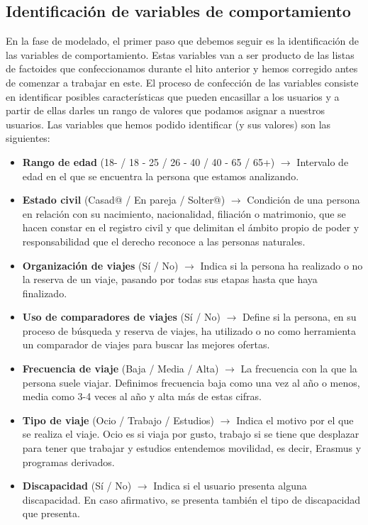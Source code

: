 \subsection{Identificación de variables de comportamiento}
En la fase de modelado, el primer paso que debemos seguir es la identificación de las variables de comportamiento. 
Estas variables van a ser producto de las listas de factoides que confeccionamos durante el hito anterior y hemos 
corregido antes de comenzar a trabajar en este. El proceso de confección de las variables consiste en identificar 
posibles características que pueden encasillar a los usuarios y a partir de ellas darles un rango de valores que 
podamos asignar a nuestros usuarios. Las variables que hemos podido identificar (y sus valores) son las siguientes:
\begin{itemize}
    \item \textbf{Rango de edad} (18- / 18 - 25 / 26 - 40 / 40 - 65 / 65+) $\rightarrow$ Intervalo de edad en el que se encuentra la persona que estamos analizando.
    \item \textbf{Estado civil} (Casad@ / En pareja / Solter@) $\rightarrow$ Condición de una persona en relación con su nacimiento, nacionalidad, filiación o 
    matrimonio, que se hacen constar en el registro civil y que delimitan el ámbito propio de poder y responsabilidad que el derecho reconoce a las personas naturales.
    \item \textbf{Organización de viajes} (Sí / No) $\rightarrow$ Indica si la persona ha realizado o no la reserva de un viaje, pasando por todas sus etapas hasta que
    haya finalizado.
    \item \textbf{Uso de comparadores de viajes} (Sí / No) $\rightarrow$ Define si la persona, en su proceso de búsqueda y reserva de viajes, ha utilizado o no como
    herramienta un comparador de viajes para buscar las mejores ofertas.
    \item \textbf{Frecuencia de viaje} (Baja / Media / Alta) $\rightarrow$ La frecuencia con la que la persona suele viajar. Definimos frecuencia baja como una vez al año
    o menos, media como 3-4 veces al año y alta más de estas cifras.
    \item \textbf{Tipo de viaje} (Ocio / Trabajo / Estudios) $\rightarrow$ Indica el motivo por el que se realiza el viaje. Ocio es si viaja por gusto, trabajo si se tiene que desplazar para tener que trabajar y estudios entendemos movilidad, es decir, Erasmus y programas derivados.
    \item \textbf{Discapacidad} (Sí / No) $\rightarrow$ Indica si el usuario presenta alguna discapacidad. En caso afirmativo, se presenta también el tipo de discapacidad que presenta.

\end{itemize}

